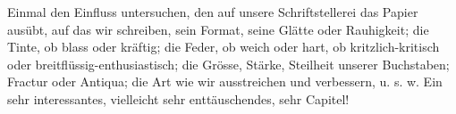 Einmal den Einfluss untersuchen, den auf unsere Schriftstellerei das Papier ausübt, auf das wir schreiben, sein Format, seine Glätte oder Rauhigkeit; die Tinte, ob blass oder kräftig; die Feder, ob weich oder hart, ob kritzlich-kritisch oder breitflüssig-enthusiastisch; die Grösse, Stärke, Steilheit unserer Buchstaben; Fractur oder Antiqua; die Art wie wir ausstreichen und verbessern, u. s. w. Ein sehr interessantes, vielleicht sehr enttäuschendes, sehr  Capitel!
\par

